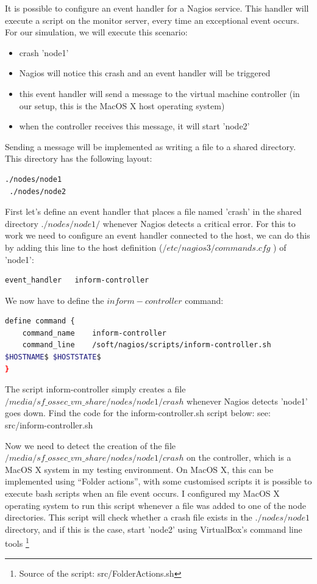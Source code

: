 \documentclass[12pt]{report}
\begin{document}
It is possible to configure an event handler for a Nagios
service. This handler will execute a script on the monitor
server, every time an exceptional event occurs.
For our simulation, we will execute this scenario:
\begin{itemize}
\item crash 'node1'
\item Nagios will notice this crash and an event handler will be
  triggered
\item this event handler will send a message to the virtual machine
  controller (in our setup, this is the MacOS X host operating
  system)
\item when the controller receives this message, it will start 'node2'
\end{itemize}
Sending a message will be implemented as writing a file to a shared
directory. This directory has the following layout:
\begin{lstlisting}[language=bash]
 ./nodes/node1
 ./nodes/node2
\end{lstlisting} 
First let's define an event handler that places a file named 'crash' in the
shared directory $./nodes/node1/$ whenever Nagios detects a critical
error.
For this to work we need to configure an event handler connected to
the host, we can do this by adding this line to the host definition ($/etc/nagios3/commands.cfg$ ) of 'node1':
\begin{lstlisting}[language=bash]
event_handler   inform-controller
\end{lstlisting} 
We now have to define the $inform-controller$ command:
\begin{lstlisting}[language=bash]
define command {
    command_name    inform-controller
    command_line    /soft/nagios/scripts/inform-controller.sh
$HOSTNAME$ $HOSTSTATE$
}
\end{lstlisting} 
The script inform-controller simply creates a file
$/media/sf\_ossec\_vm\_share/nodes/node1/crash$ whenever Nagios
detects 'node1' goes down.
Find the code for the inform-controller.sh script below:
see: src/inform-controller.sh

Now we need to detect the creation of the file
$/media/sf\_ossec\_vm\_share/nodes/node1/crash$  on the controller,
which is a MacOS X system in my testing environment. On MacOS X, this
can be implemented using ``Folder actions'', with some customised scripts
\cite{folder_actions_bash} it is possible to execute bash scripts when
an file event occurs.
I configured my MacOS X operating system to run this script whenever a
file was added to one of the node directories.
This script will check whether a crash file exists in the $./nodes/node1$
directory, and if this is the case, start 'node2' using VirtualBox's
command line tools \footnote{Source of the script: src/FolderActions.sh}
\end{document}
